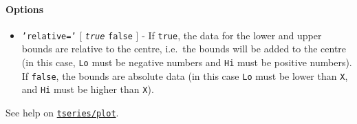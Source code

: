 \paragraph{Options}

\begin{itemize}
\itemsep1pt\parskip0pt
\item
  \texttt{'relative='} {[} \emph{\texttt{true}} \textbar{}
  \texttt{false} {]} - If \texttt{true}, the data for the lower and
  upper bounds are relative to the centre, i.e.~the bounds will be added
  to the centre (in this case, \texttt{Lo} must be negative numbers and
  \texttt{Hi} must be positive numbers). If \texttt{false}, the bounds
  are absolute data (in this case \texttt{Lo} must be lower than
  \texttt{X}, and \texttt{Hi} must be higher than \texttt{X}).
\end{itemize}

See help on \href{tseries/plot}{\texttt{tseries/plot}}.



